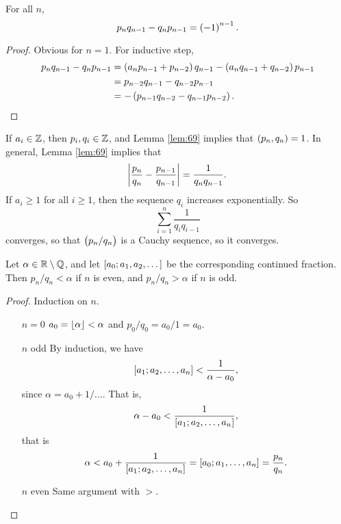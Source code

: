 \begin{lemma}
\label{lem:69}
For all $ n $,
$$ p_nq_{n - 1} - q_np_{n - 1} = \br{-1}^{n - 1}. $$
\end{lemma}

\begin{proof}
Obvious for $ n = 1 $. For inductive step,
\begin{align*}
p_nq_{n - 1} - q_np_{n - 1}
& = \br{a_np_{n - 1} + p_{n - 2}}q_{n - 1} - \br{a_nq_{n - 1} + q_{n - 2}}p_{n - 1} \\
& = p_{n - 2}q_{n - 1} - q_{n - 2}p_{n - 1} \\
& = -\br{p_{n - 1}q_{n - 2} - q_{n - 1}p_{n - 2}}.
\end{align*}
\end{proof}

\pagebreak

\begin{note*}
If $ a_i \in \mathbb{Z} $, then $ p_i, q_i \in \mathbb{Z} $, and Lemma \ref{lem:69} implies that $ \br{p_n, q_n} = 1 $. In general, Lemma \ref{lem:69} implies that
$$ \abs{\dfrac{p_n}{q_n} - \dfrac{p_{n - 1}}{q_{n - 1}}} = \dfrac{1}{q_nq_{n - 1}}. $$
If $ a_i \ge 1 $ for all $ i \ge 1 $, then the sequence $ q_i $ increases exponentially. So
$$ \sum_{i = 1}^n \dfrac{1}{q_iq_{i - 1}} $$
converges, so that $ \br{p_n / q_n} $ is a Cauchy sequence, so it converges.
\end{note*}


\begin{lemma}
\label{lem:70}
Let $ \alpha \in \mathbb{R} \setminus \mathbb{Q} $, and let $ \sbr{a_0; a_1, a_2, \dots} $ be the corresponding continued fraction. Then $ p_n / q_n < \alpha $ if $ n $ is even, and $ p_n / q_n > \alpha $ if $ n $ is odd.
\end{lemma}

\begin{proof}
Induction on $ n $.
\begin{itemize}[leftmargin=0.5in]
\item[$ n = 0 $] $ a_0 = \left\lfloor \alpha \right\rfloor < \alpha $ and $ p_0 / q_0 = a_0 / 1 = a_0 $.
\item[$ n $ odd] By induction, we have
$$ \sbr{a_1; a_2, \dots, a_n} < \dfrac{1}{\alpha - a_0}, $$
since $ \alpha = a_0 + 1 / \dots $. That is,
$$ \alpha - a_0 < \dfrac{1}{\sbr{a_1; a_2, \dots, a_n}}, $$
that is
$$ \alpha < a_0 + \dfrac{1}{\sbr{a_1; a_2, \dots, a_n}} = \sbr{a_0; a_1, \dots, a_n} = \dfrac{p_n}{q_n}. $$
\item[$ n $ even] Same argument with $ > $.
\end{itemize}
\end{proof}

